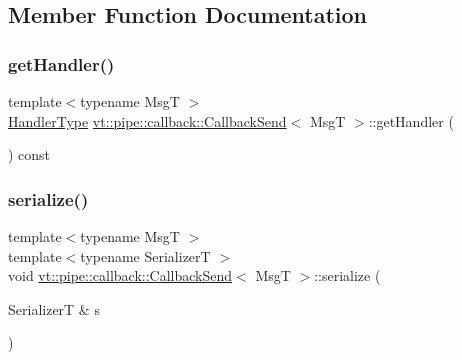 \subsection{Member Function Documentation}
\mbox{\label{structvt_1_1pipe_1_1callback_1_1_callback_send_ad02a9711c4603807d6fe40a5dd3b4859}} 
\subsubsection{\texorpdfstring{get\+Handler()}{getHandler()}}
{\footnotesize\ttfamily template$<$typename MsgT $>$ \\
\hyperlink{namespacevt_af64846b57dfcaf104da3ef6967917573}{Handler\+Type} \hyperlink{structvt_1_1pipe_1_1callback_1_1_callback_send}{vt\+::pipe\+::callback\+::\+Callback\+Send}$<$ MsgT $>$\+::get\+Handler (\begin{DoxyParamCaption}{ }\end{DoxyParamCaption}) const\hspace{0.3cm}{\ttfamily [inline]}}

\mbox{\label{structvt_1_1pipe_1_1callback_1_1_callback_send_ae3abb8abfeee32b445a4ff13fd591745}} 
\subsubsection{\texorpdfstring{serialize()}{serialize()}}
{\footnotesize\ttfamily template$<$typename MsgT $>$ \\
template$<$typename SerializerT $>$ \\
void \hyperlink{structvt_1_1pipe_1_1callback_1_1_callback_send}{vt\+::pipe\+::callback\+::\+Callback\+Send}$<$ MsgT $>$\+::serialize (\begin{DoxyParamCaption}\item[{SerializerT \&}]{s }\end{DoxyParamCaption})}

